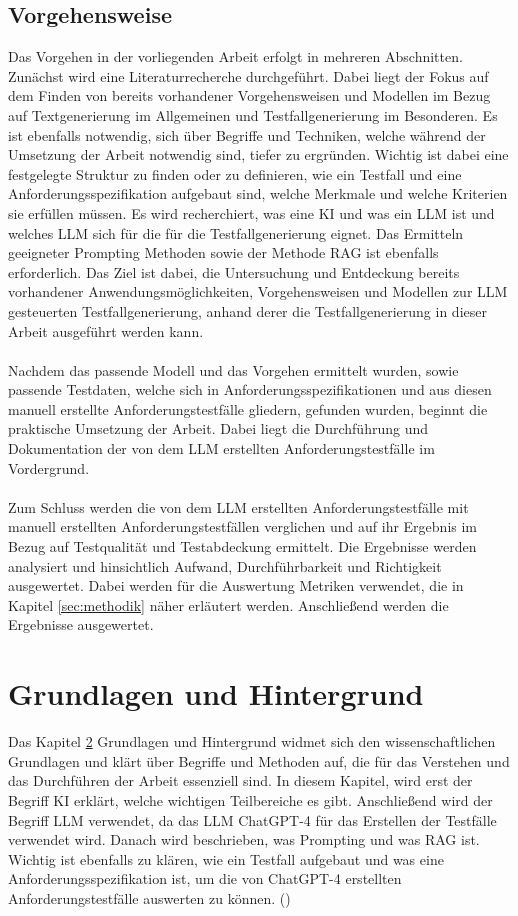 \documentclass[12pt,toc=bib,toc=listof]{scrreprt}
\begin{document}
\section{Vorgehensweise} %
\label{sec:vorgehensweise}
Das Vorgehen in der vorliegenden Arbeit erfolgt in mehreren Abschnitten. Zunächst wird eine Literaturrecherche durchgeführt. Dabei liegt der Fokus auf dem Finden von bereits vorhandener Vorgehensweisen und Modellen im Bezug auf Textgenerierung im Allgemeinen und Testfallgenerierung im Besonderen. Es ist ebenfalls notwendig, sich über Begriffe und Techniken, welche während der Umsetzung der Arbeit notwendig sind, tiefer zu ergründen. Wichtig ist dabei eine festgelegte Struktur zu finden oder zu definieren, wie ein Testfall und eine Anforderungsspezifikation aufgebaut sind, welche Merkmale und welche Kriterien sie erfüllen müssen. Es wird recherchiert, was eine KI und was ein LLM ist und welches LLM sich für die für die Testfallgenerierung eignet. Das Ermitteln geeigneter Prompting Methoden sowie der Methode RAG ist ebenfalls erforderlich. Das Ziel ist dabei, die Untersuchung und Entdeckung bereits vorhandener Anwendungsmöglichkeiten, Vorgehensweisen und Modellen zur LLM gesteuerten Testfallgenerierung, anhand derer die Testfallgenerierung in dieser Arbeit ausgeführt werden kann.\\
\\
Nachdem das passende Modell und das Vorgehen ermittelt wurden, sowie passende Testdaten, welche sich in Anforderungsspezifikationen und aus diesen manuell erstellte Anforderungstestfälle gliedern, gefunden wurden, beginnt die praktische Umsetzung der Arbeit. Dabei liegt die Durchführung und Dokumentation der von dem LLM erstellten Anforderungstestfälle im Vordergrund.\\
\\
Zum Schluss werden die von dem LLM erstellten Anforderungstestfälle mit manuell erstellten Anforderungstestfällen verglichen und auf ihr Ergebnis im Bezug auf Testqualität und Testabdeckung ermittelt. Die Ergebnisse werden analysiert und hinsichtlich Aufwand, Durchführbarkeit und Richtigkeit ausgewertet. Dabei werden für die Auswertung Metriken verwendet, die in Kapitel \ref{sec:methodik} näher erläutert werden. Anschließend werden die Ergebnisse ausgewertet.

\chapter{Grundlagen und Hintergrund} %
\label{sec:grundlagenUndHintergrund}
Das Kapitel \ref{sec:grundlagenUndHintergrund} Grundlagen und Hintergrund widmet sich den wissenschaftlichen Grundlagen und klärt über Begriffe und Methoden auf, die für das Verstehen und das Durchführen der Arbeit essenziell sind. In diesem Kapitel, wird erst der Begriff KI erklärt, welche wichtigen Teilbereiche es gibt. Anschließend wird der Begriff LLM verwendet, da das LLM ChatGPT-4 für das Erstellen der Testfälle verwendet wird. Danach wird beschrieben, was Prompting und was RAG ist. Wichtig ist ebenfalls zu klären, wie ein Testfall aufgebaut und was eine Anforderungsspezifikation ist, um die von ChatGPT-4 erstellten Anforderungstestfälle auswerten zu können. (\cite{OpenAI2025})
\end{document}
